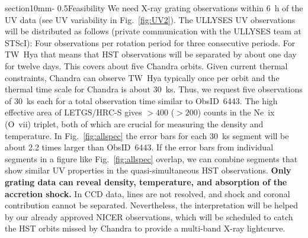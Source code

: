 \documentclass[letterpaper,11pt,twocolumn]{article}
\makeatletter
\renewcommand{\section}{\@startsection%
{section}{1}{0mm}{-\baselineskip}%
{0.5\baselineskip}{\normalfont\Large\bfseries}}%
\makeatother
\begin{document}
\section{Feasibility}
We need X-ray grating observations within 6~h of the UV data (see UV
variability in Fig.~\ref{fig:UV2}). The ULLYSES UV observations will be
distributed as follows (private communication with the ULLYSES team at
STScI): Four observations per rotation period for three consecutive
periods. For TW~Hya that means that HST observations will be separated by
about one day for twelve days. This covers about five Chandra
orbits. Given current thermal constraints, Chandra can observe TW~Hya
typically once per orbit and the thermal time scale for Chandra is
about 30~ks. Thus, we request five observations of 30~ks each for a
total observation time similar to ObsID~6443. The high
effective area of LETGS/HRC-S gives $> 400$ ($>200$) counts in the Ne~{\sc ix} (O~{\sc vii}) triplet, both of which are
crucial for measuring the density and temperature.
In Fig.~\ref{fig:allspec} the error bars for
each 30~ks segment will be about 2.2 times larger than ObsID~6443. If
the error bars from individual segments in a figure like
Fig.~\ref{fig:allspec} overlap, we can combine segments that show
similar UV properties in the quasi-simultaneous HST observations.
\textbf{Only grating data can reveal density, temperature, and absorption of the accretion shock.} In CCD data, lines are not resolved, and shock and coronal contribution cannot be separated. Nevertheless, the interpretation will be helped by our already approved NICER observations, which will be scheduled to catch the HST orbits missed by Chandra to provide a multi-band X-ray lightcurve.
 







%
\end{document}
